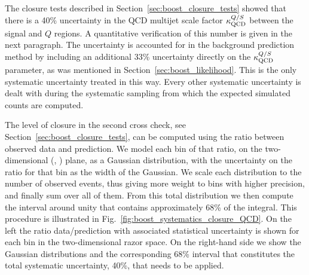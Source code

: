 The closure tests described in Section~\ref{sec:boost_closure_tests} showed that there is a 40\%
uncertainty in the QCD multijet scale factor $\kappa_{\rm QCD}^{Q/S}$ between the signal and $Q$
regions. 
A quantitative verification of this number is given in the next paragraph. 
The uncertainty is accounted for in the background prediction method by including an additional 33\%
uncertainty directly on the $\kappa_{\rm QCD}^{Q/S}$ parameter, as was mentioned in
Section~\ref{sec:boost_likelihood}.
This is the only systematic uncertainty treated in this way. Every other systematic uncertainty is
dealt with during the systematic sampling from which the expected simulated counts are computed.

The level of closure in the second cross check, see Section~\ref{sec:boost_closure_tests}, can be
computed using the ratio between observed data and prediction.
We model each bin of that ratio, on the two-dimensional (\mr, \rsq) plane, as a Gaussian
distribution, with the uncertainty on the ratio for that bin as the width of the Gaussian. 
We scale each distribution to the number of observed events, thus giving more weight to bins with
higher precision, and finally sum over all of them. 
From this total distribution we then compute the interval around unity that contains approximately
68\% of the integral. 
This procedure is illustrated in Fig.~\ref{fig:boost_systematics_closure_QCD}. 
On the left the ratio data/prediction with associated statistical uncertainty is shown for each bin
in the two-dimensional razor space. 
On the right-hand side we show the Gaussian distributions and the corresponding 68\% interval that
constitutes the total systematic uncertainty, 40\%, that needs to be applied. 

